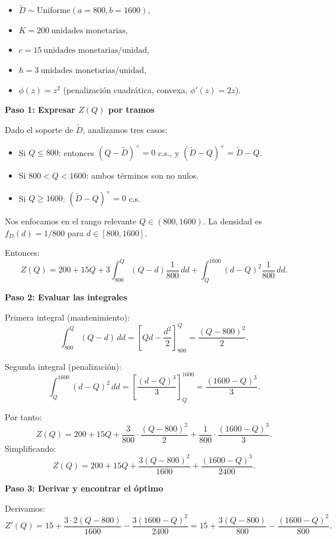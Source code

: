\documentclass[
  spanish,
  us-letterpaper,
  DIV=11,
  numbers=noendperiod]{scrreprt}
\providecommand{\tightlist}{%
  \setlength{\itemsep}{0pt}\setlength{\parskip}{0pt}}
\numberwithin{equation}{section}
\begin{document}
\begin{itemize}
\tightlist
\item
  \(\tilde{D} \sim \text{Uniforme}(a=800, b=1600)\),
\item
  \(K = 200~\text{unidades monetarias}\),
\item
  \(c = 15~\text{unidades monetarias/unidad}\),
\item
  \(h = 3~\text{unidades monetarias/unidad}\),
\item
  \(\phi(z) = z^2\) (penalización cuadrática, convexa,
  \(\phi'(z) = 2z\)).
\end{itemize}

\textbf{Paso 1: Expresar \(Z(Q)\) por tramos}

Dado el soporte de \(\tilde{D}\), analizamos tres casos:

\begin{itemize}
\tightlist
\item
  Si \(Q \leq 800\): entonces \((Q - \tilde{D})^+ = 0\) c.s., y
  \((\tilde{D} - Q)^+ = \tilde{D} - Q\).
\item
  Si \(800 < Q < 1600\): ambos términos son no nulos.
\item
  Si \(Q \geq 1600\): \((\tilde{D} - Q)^+ = 0\) c.s.
\end{itemize}

Nos enfocamos en el rango relevante \(Q \in (800, 1600)\). La densidad
es \(f_D(d) = 1/800\) para \(d \in [800, 1600]\).

Entonces: \[
Z(Q) = 200 + 15Q + 3 \int_{800}^Q (Q - d) \frac{1}{800} \, dd + \int_Q^{1600} (d - Q)^2 \frac{1}{800} \, dd.
\]

\textbf{Paso 2: Evaluar las integrales}

Primera integral (mantenimiento): \[
\int_{800}^Q (Q - d) \, dd = \left[ Qd - \frac{d^2}{2} \right]_{800}^Q = \frac{(Q - 800)^2}{2}.
\]

Segunda integral (penalización): \[
\int_Q^{1600} (d - Q)^2 \, dd = \left[ \frac{(d - Q)^3}{3} \right]_Q^{1600} = \frac{(1600 - Q)^3}{3}.
\]

Por tanto: \[
Z(Q) = 200 + 15Q + \frac{3}{800} \cdot \frac{(Q - 800)^2}{2} + \frac{1}{800} \cdot \frac{(1600 - Q)^3}{3}.
\] Simplificando: \[
Z(Q) = 200 + 15Q + \frac{3 (Q - 800)^2}{1600} + \frac{(1600 - Q)^3}{2400}.
\]

\textbf{Paso 3: Derivar y encontrar el óptimo}

Derivamos: \[
Z'(Q) = 15 + \frac{3 \cdot 2 (Q - 800)}{1600} - \frac{3 (1600 - Q)^2}{2400}
= 15 + \frac{3(Q - 800)}{800} - \frac{(1600 - Q)^2}{800}.
\]
\end{document}
